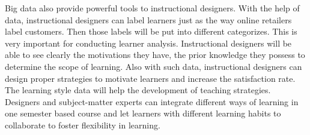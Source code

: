 \documentclass[sigconf]{acmart}
\begin{document}
Big data also provide powerful tools to instructional designers. With the help of data, instructional designers can label learners just as the way online retailers label customers. Then those labels will be put into different categorizes. This is very important for conducting learner analysis. Instructional designers will be able to see clearly the motivations they have, the prior knowledge they possess to determine the scope of learning. Also with such data, instructional designers can design proper strategies to motivate learners and increase the satisfaction rate. The learning style data will help the development of teaching strategies. Designers and subject-matter experts can integrate different ways of learning in one semester based course and let learners with different learning habits to collaborate to foster flexibility in learning.
\\
\end{document}
